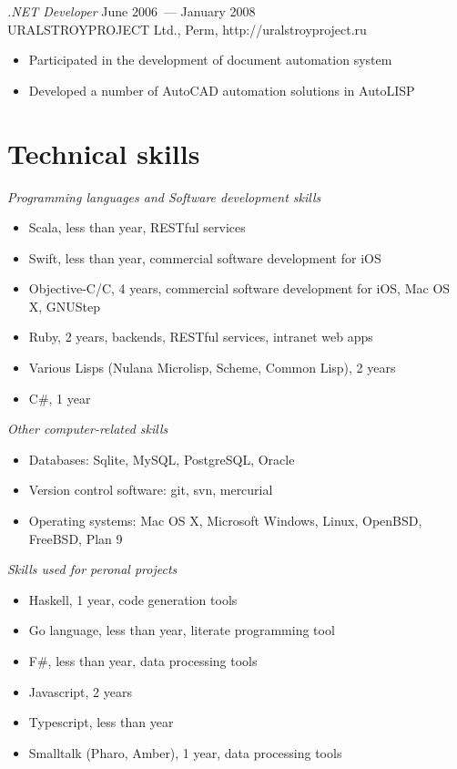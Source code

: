 \documentclass[12pt]{res}
\begin{document}
\begin{resume}
{\sl .NET Developer} \hfill June 2006~--- January 2008 \\
URALSTROYPROJECT Ltd., Perm, http://uralstroyproject.ru
\begin{itemize}
\item Participated in the development of document automation system
\item Developed a number of AutoCAD automation solutions in AutoLISP
\end{itemize}

\section{Technical skills} 

{\sl Programming languages and Software development skills} 
\begin{itemize}
\item Scala, less than year, RESTful services
\item Swift, less than year, commercial software development for iOS
\item Objective-C/C, 4 years, commercial software development for iOS, Mac OS X, GNUStep
\item Ruby, 2 years, backends, RESTful services, intranet web apps
\item Various Lisps (Nulana Microlisp, Scheme, Common Lisp), 2 years
\item C\#, 1 year
\end{itemize}

{\sl Other computer-related skills}
\begin{itemize}
\item Databases: Sqlite, MySQL, PostgreSQL, Oracle
\item Version control software: git, svn, mercurial
\item Operating systems: Mac OS X, Microsoft Windows, Linux, OpenBSD, FreeBSD, Plan 9
\end{itemize} 

{\sl Skills used for peronal projects}
\begin{itemize}
\item Haskell, 1 year, code generation tools
\item Go language, less than year, literate programming tool
\item F\#, less than year, data processing tools
\item Javascript, 2 years
\item Typescript, less than year
\item Smalltalk (Pharo, Amber), 1 year, data processing tools
\end{itemize}


\end{resume}
\end{document}
